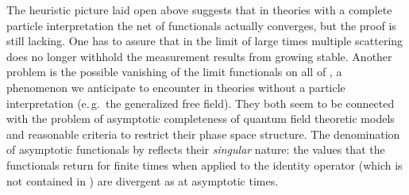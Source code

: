 \documentclass[a4paper,a4paper]{article}
\numberwithin{equation}{section}
\providecommand{\Cfrak}{\mathfrak{C}}
\providecommand{\unit}{\mathbf{1}}
\theoremstyle{definition}
\theoremstyle{plain}
\theoremstyle{remark}
\providecommand{\abs}[1]{\lvert #1 \rvert}
\begin{document}
  The heuristic picture laid open above suggests that in theories with
  a complete particle interpretation the net of functionals actually
  converges, but the proof is still lacking. One has to assure that in
  the limit of large times multiple scattering does no longer withhold
  the measurement results \coordHE{} from growing stable.
  Another problem is the possible vanishing of the limit functionals
  on all of \myHighlight{$\Cfrak$}\coordHE{}, a phenomenon we anticipate to encounter in
  theories without a particle interpretation (e.\,g.~the generalized
  free field). They both seem to be connected with the problem of
  asymptotic completeness of quantum field theoretic models and
  reasonable criteria to restrict their phase space structure. The
  denomination of asymptotic functionals by \myHighlight{$\sigma$}\coordHE{} reflects their
  \emph{singular} nature: the values that the functionals \coordHE{} return for finite times \coordHE{} when applied to the identity
  operator \myHighlight{$\unit$}\coordHE{} (which is not contained in \myHighlight{$\Cfrak$}\coordHE{}) are divergent
  as \myHighlight{$\abs{t}^s$}\coordHE{} at asymptotic times.
  
\end{document}
